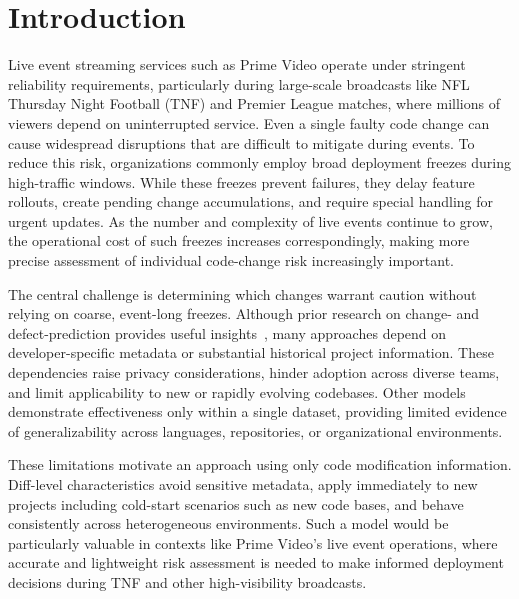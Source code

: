 \section{Introduction}



Live event streaming services such as Prime Video operate under stringent reliability requirements, particularly during large-scale broadcasts like NFL Thursday Night Football (TNF) and Premier League matches, where millions of viewers depend on uninterrupted service. Even a single faulty code change can cause widespread disruptions that are difficult to mitigate during events. To reduce this risk, organizations commonly employ broad deployment freezes during high-traffic windows. While these freezes prevent failures, they delay feature rollouts, create pending change accumulations, and require special handling for urgent updates. As the number and complexity of live events continue to grow, the operational cost of such freezes increases correspondingly, making more precise assessment of individual code-change risk increasingly important.

The central challenge is determining which changes warrant caution without relying on coarse, event-long freezes. Although prior research on change- and defect-prediction provides useful insights~\cite{kamei2012large,6772130}, many approaches depend on developer-specific metadata or substantial historical project information. These dependencies raise privacy considerations, hinder adoption across diverse teams, and limit applicability to new or rapidly evolving codebases. Other models demonstrate effectiveness only within a single dataset, providing limited evidence of generalizability across languages, repositories, or organizational environments.

These limitations motivate an approach using only code modification information. Diff-level characteristics avoid sensitive metadata, apply immediately to new projects including cold-start scenarios such as new code bases, and behave consistently across heterogeneous environments. Such a model would be particularly valuable in contexts like Prime Video's live event operations, where accurate and lightweight risk assessment is needed to make informed deployment decisions during TNF and other high-visibility broadcasts.

